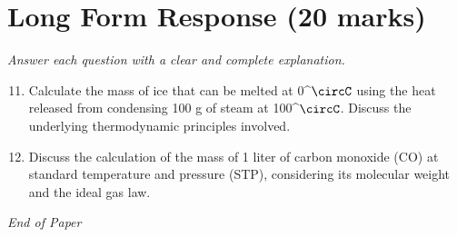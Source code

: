 \documentclass[12pt]{article}
\begin{document}
\section*{Long Form Response (20 marks)}
\textit{Answer each question with a clear and complete explanation.}
\begin{enumerate}[label=\arabic*.]
\setcounter{enumi}{10}
\item Calculate the mass of ice that can be melted at 0^\ensuremath{\circC} using the heat released from condensing 100 g of steam at 100^\ensuremath{\circC}. Discuss the underlying thermodynamic principles involved.
\item Discuss the calculation of the mass of 1 liter of carbon monoxide (CO) at standard temperature and pressure (STP), considering its molecular weight and the ideal gas law.
\end{enumerate}

\vfill
\noindent\textit{End of Paper}
\end{document}
